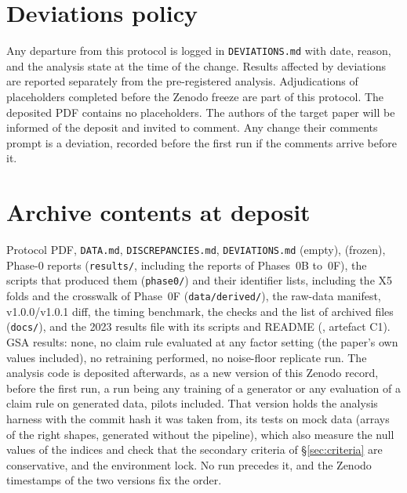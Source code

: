 \documentclass[11pt,a4paper]{article}
\newcommand{\prop}[1]{#1}
\newcommand{\prop}[1]{\textcolor{blue}{#1}}
\begin{document}
\section{Deviations policy}\label{sec:deviations}
Any departure from this protocol is logged in \texttt{DEVIATIONS.md} with
date, reason, and the analysis state at the time of the change. Results
affected by deviations are reported separately from the pre-registered
analysis. Adjudications of placeholders completed before the Zenodo freeze
are part of this protocol. The deposited PDF contains no placeholders.
The authors of the target paper will be informed of the deposit and
invited to comment. Any change their comments prompt is a deviation,
recorded before the first run if the comments arrive before it.

\section{Archive contents at deposit}\label{sec:archive}
Protocol PDF, \texttt{DATA.md}, \texttt{DISCREPANCIES.md},
\texttt{DEVIATIONS.md} (empty), 
(frozen), Phase-0 reports (\texttt{results/}, including the
reports of Phases~0B to~\prop{0F}), the scripts that
produced them (\texttt{phase0/}) and their identifier lists,
including the X5 folds \prop{and the crosswalk of Phase~0F}
(\texttt{data/derived/}), the raw-data manifest, v1.0.0/v1.0.1
diff, \prop{the timing benchmark, the checks and the list of archived files
(\texttt{docs/}),} and the 2023 results file with its scripts and README
(, artefact C1). GSA
results: none, no claim rule evaluated at any factor setting (the paper's
own values included), no retraining performed, no noise-floor replicate
run. The analysis code is deposited afterwards, as a new version of
this Zenodo record, before the first run, a run being any training of a
generator or any evaluation of a claim rule on generated data, pilots
included. That version holds the analysis harness with the commit hash it
was taken from, its tests on mock data (arrays of the right shapes,
generated without the pipeline), which also measure the null values of the
indices and check that the secondary criteria of \S\ref{sec:criteria} are
conservative, and the environment lock. No run precedes
it, and the Zenodo timestamps of the two versions fix the order.

\appendix
\end{document}
